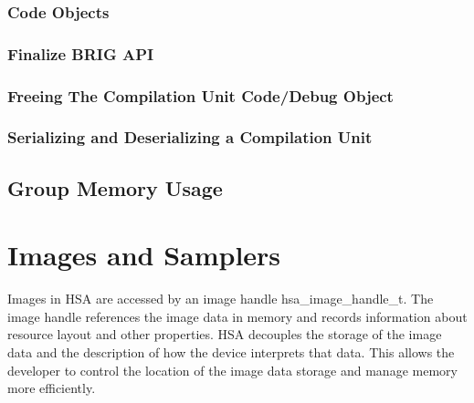 \documentclass[final]{book}
\newcommand{\reftyp}[1]{#1}
\begin{document}
\subsubsection{Code Objects}\label{finalize:codeobject}














\subsubsection{Finalize BRIG API}







\subsubsection{Freeing The Compilation Unit Code/Debug Object}



\subsubsection{Serializing and Deserializing a Compilation Unit}



\hypertarget{groupmem}{}\subsection{Group Memory
  Usage}\label{groupmem}
















\section{Images and Samplers}
\label{images} \hypertarget{images}{}

Images in HSA are accessed by an image handle \reftyp{hsa_image_handle_t}. The
image handle references the image data in memory and records information about
resource layout and other properties. HSA decouples the storage of the image
data and the description of how the device interprets that data. This allows the
developer to control the location of the image data storage and manage memory
more efficiently.
\end{document}
